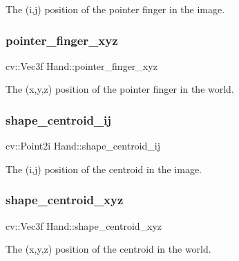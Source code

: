 The (i,j) position of the pointer finger in the image. 

\hypertarget{class_hand_abeb7b0f0414f128dff4a189137fe35c9}{}\label{class_hand_abeb7b0f0414f128dff4a189137fe35c9} 
\subsubsection{\texorpdfstring{pointer\+\_\+finger\+\_\+xyz}{pointer\_finger\_xyz}}
{\footnotesize\ttfamily cv\+::\+Vec3f Hand\+::pointer\+\_\+finger\+\_\+xyz}



The (x,y,z) position of the pointer finger in the world. 

\hypertarget{class_hand_a86d74ccce4bbfafa5825762713d38b44}{}\label{class_hand_a86d74ccce4bbfafa5825762713d38b44} 
\subsubsection{\texorpdfstring{shape\+\_\+centroid\+\_\+ij}{shape\_centroid\_ij}}
{\footnotesize\ttfamily cv\+::\+Point2i Hand\+::shape\+\_\+centroid\+\_\+ij}



The (i,j) position of the centroid in the image. 

\hypertarget{class_hand_a3991a22a52268c3b469a4221fbfdb695}{}\label{class_hand_a3991a22a52268c3b469a4221fbfdb695} 
\subsubsection{\texorpdfstring{shape\+\_\+centroid\+\_\+xyz}{shape\_centroid\_xyz}}
{\footnotesize\ttfamily cv\+::\+Vec3f Hand\+::shape\+\_\+centroid\+\_\+xyz}



The (x,y,z) position of the centroid in the world. 

\hypertarget{class_hand_a505288f2ffe79800bcb8b5ccb4f1995a}{}\label{class_hand_a505288f2ffe79800bcb8b5ccb4f1995a} 
